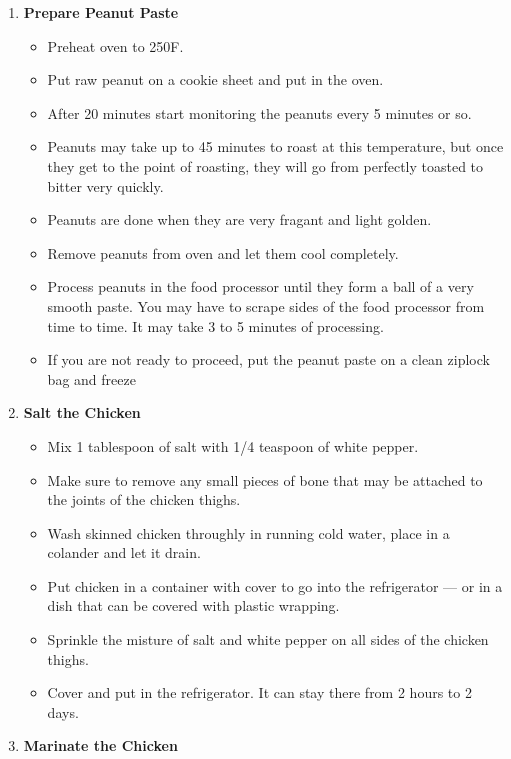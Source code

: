 \documentclass[11pt,letterpaper]{article}
\begin{document}
\begin{description}
\begin{enumerate}
\begin{itemize}
	\end{itemize}
	\item {\bf Prepare Peanut Paste}
	\begin{itemize}
        \item Preheat oven to 250F.
	\item Put raw peanut on a cookie sheet and put in the oven.
	\item After 20 minutes start monitoring the peanuts every 5
          minutes or so.
        \item Peanuts may take up to 45 minutes to roast at this temperature,
              but once they get to the point of roasting, they will go from
              perfectly toasted to bitter very quickly.
        \item Peanuts are done when they are very fragant and light golden.
        \item Remove peanuts from oven and let them cool completely.
        \item Process peanuts in the food processor until they form a
          ball of a very smooth paste. You may have to scrape sides of
          the food processor from time to time. It may take 3 to 5
          minutes of processing.
        \item If you are not ready to proceed, put the peanut paste on
          a clean ziplock bag and freeze
	\end{itemize}
	\item {\bf Salt the Chicken}
	\begin{itemize}
	\item Mix 1 tablespoon of salt with 1/4 teaspoon of white pepper.
        \item Make sure to remove any small pieces of bone that may be
          attached to the joints of the chicken thighs.
	\item Wash skinned chicken throughly in running cold water,
          place in a colander and let it drain.
        \item Put chicken in a container with cover to go into the
          refrigerator --- or in a dish that can be covered with
          plastic wrapping.
	\item Sprinkle the misture of salt and white pepper on all
          sides of the chicken thighs.
	\item Cover and put in the refrigerator. It can stay there
          from 2 hours to 2 days.
	\end{itemize}
	\item {\bf Marinate the Chicken}

\end{enumerate}
\end{description}
\end{document}
